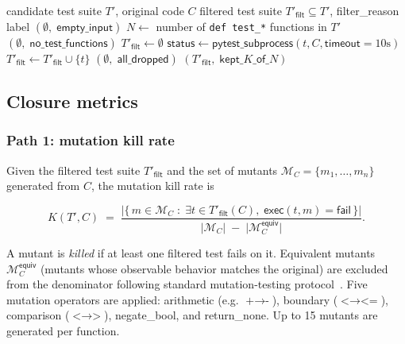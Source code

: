 \begin{algorithm}[h]
\caption{Test-filter validity gate (implements Eq.~\ref{eq:filter})}
\label{alg:test_filter}
\begin{algorithmic}[1]
\Require candidate test suite $T'$, original code $C$
\Ensure filtered test suite $T'_{\textsf{filt}} \subseteq T'$, \textsf{filter\_reason} label
  \State \Return $(\emptyset,\; \textsf{empty\_input})$
\EndIf
\State $N \leftarrow$ number of \texttt{def test\_*} functions in $T'$
  \State \Return $(\emptyset,\; \textsf{no\_test\_functions})$
\EndIf
\State $T'_{\textsf{filt}} \leftarrow \emptyset$
  \State $\textsf{status} \leftarrow \textsf{pytest\_subprocess}(t, C, \textsf{timeout} = 10\text{s})$
    \State $T'_{\textsf{filt}} \leftarrow T'_{\textsf{filt}} \cup \{t\}$
  \EndIf
\EndFor
{}
  \State \Return $(\emptyset,\; \textsf{all\_dropped})$ 
\EndIf
\State \Return $(T'_{\textsf{filt}},\; \textsf{kept}\_K\_\textsf{of}\_N)$
\end{algorithmic}
\end{algorithm}

\subsection{Closure metrics}

\subsubsection{Path 1: mutation kill rate}

Given the filtered test suite $T'_{\textsf{filt}}$ and the set of mutants $\mathcal{M}_C = \{m_1, \ldots, m_n\}$ generated from $C$, the mutation kill rate is

\begin{equation}
  K(T', C)
  \;=\;
  \frac{\bigl|\{\, m \in \mathcal{M}_C \;:\; \exists t \in T'_{\textsf{filt}}(C),\; \textsf{exec}(t, m) = \textsf{fail} \,\}\bigr|}{\bigl|\mathcal{M}_C\bigr| \;-\; \bigl|\mathcal{M}_C^{\textsf{equiv}}\bigr|}.
  \label{eq:killrate}
\end{equation}

A mutant is \emph{killed} if at least one filtered test fails on it. Equivalent mutants $\mathcal{M}_C^{\textsf{equiv}}$ (mutants whose observable behavior matches the original) are excluded from the denominator following standard mutation-testing protocol~\citep{Andrews2005MutationAnalysis, Just2014MutationAnalysis}. Five mutation operators are applied: arithmetic (e.g. $\texttt{+} \to \texttt{-}$), boundary ($\texttt{<} \to \texttt{<=}$), comparison ($\texttt{<} \to \texttt{>}$), negate\_bool, and return\_none. Up to 15 mutants are generated per function.

